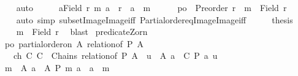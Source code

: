 \begin{isabellebody}
\ \ \ \ \isamarkupfalse%
\ auto\isanewline
\ \ \isamarkupfalse%
\ \isamarkupfalse%
\ {\isachardoublequoteopen}{\isasymforall}a{\isasymin}Field\ r{\isachardot}{\kern0pt}\ {\isacharparenleft}{\kern0pt}m{\isacharcomma}{\kern0pt}\ a{\isacharparenright}{\kern0pt}\ {\isasymin}\ r\ {\isasymlongrightarrow}\ a\ {\isacharequal}{\kern0pt}\ m{\isachardoublequoteclose}\isanewline
\ \ \ \ \isamarkupfalse%
\ po\ \ {\isacartoucheopen}Preorder\ r{\isacartoucheclose}\ \ {\isacartoucheopen}m\ {\isasymin}\ Field\ r{\isacartoucheclose}\isanewline
\ \ \ \ \isamarkupfalse%
\ {\isacharparenleft}{\kern0pt}auto\ simp{\isacharcolon}{\kern0pt}\ subset{\isacharunderscore}{\kern0pt}Image{}{\isacharunderscore}{\kern0pt}Image{}{\isacharunderscore}{\kern0pt}iff\ Partial{\isacharunderscore}{\kern0pt}order{\isacharunderscore}{\kern0pt}eq{\isacharunderscore}{\kern0pt}Image{}{\isacharunderscore}{\kern0pt}Image{}{\isacharunderscore}{\kern0pt}iff{\isacharparenright}{\kern0pt}\isanewline
\ \ \isamarkupfalse%
\ \isamarkupfalse%
\ {\isacharquery}{\kern0pt}thesis\isanewline
\ \ \ \ \isamarkupfalse%
\ {\isacartoucheopen}m\ {\isasymin}\ Field\ r{\isacartoucheclose}\ \isamarkupfalse%
\ blast\isanewline
{}\isamarkupfalse%
%
\endisatagproof
{\isafoldproof}%
%
\isadelimproof
\isanewline
%
\endisadelimproof
\isanewline
{}\isamarkupfalse%
\ predicate{\isacharunderscore}{\kern0pt}Zorn{\isacharcolon}{\kern0pt}\isanewline
\ \ \ po{\isacharcolon}{\kern0pt}\ {\isachardoublequoteopen}partial{\isacharunderscore}{\kern0pt}order{\isacharunderscore}{\kern0pt}on\ A\ {\isacharparenleft}{\kern0pt}relation{\isacharunderscore}{\kern0pt}of\ P\ A{\isacharparenright}{\kern0pt}{\isachardoublequoteclose}\isanewline
\ \ \ \ \ ch{\isacharcolon}{\kern0pt}\ {\isachardoublequoteopen}{\isasymAnd}C{\isachardot}{\kern0pt}\ C\ {\isasymin}\ Chains\ {\isacharparenleft}{\kern0pt}relation{\isacharunderscore}{\kern0pt}of\ P\ A{\isacharparenright}{\kern0pt}\ {\isasymLongrightarrow}\ {\isasymexists}u\ {\isasymin}\ A{\isachardot}{\kern0pt}\ {\isasymforall}a\ {\isasymin}\ C{\isachardot}{\kern0pt}\ P\ a\ u{\isachardoublequoteclose}\isanewline
\ \ \ {\isachardoublequoteopen}{\isasymexists}m\ {\isasymin}\ A{\isachardot}{\kern0pt}\ {\isasymforall}a\ {\isasymin}\ A{\isachardot}{\kern0pt}\ P\ m\ a\ {\isasymlongrightarrow}\ a\ {\isacharequal}{\kern0pt}\ m{\isachardoublequoteclose}\isanewline

\end{isabellebody}
